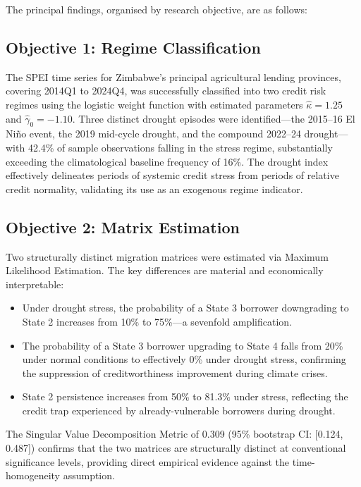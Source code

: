 \documentclass[12pt,a4paper]{article}
\begin{document}
The principal findings, organised by research objective, are as follows:

\subsection{Objective 1: Regime Classification}

The SPEI time series for Zimbabwe's principal agricultural lending provinces, covering 2014Q1 to 2024Q4, was successfully classified into two credit risk regimes using the logistic weight function with estimated parameters $\hat{\kappa} = 1.25$ and $\hat{\gamma}_0 = -1.10$. Three distinct drought episodes were identified---the 2015--16 El Niño event, the 2019 mid-cycle drought, and the compound 2022--24 drought---with 42.4\% of sample observations falling in the stress regime, substantially exceeding the climatological baseline frequency of 16\%. The drought index effectively delineates periods of systemic credit stress from periods of relative credit normality, validating its use as an exogenous regime indicator.

\subsection{Objective 2: Matrix Estimation}

Two structurally distinct migration matrices were estimated via Maximum Likelihood Estimation. The key differences are material and economically interpretable:

\begin{itemize}[noitemsep]
    \item Under drought stress, the probability of a State 3 borrower downgrading to State 2 increases from 10\% to 75\%---a sevenfold amplification.
    \item The probability of a State 3 borrower upgrading to State 4 falls from 20\% under normal conditions to effectively 0\% under drought stress, confirming the suppression of creditworthiness improvement during climate crises.
    \item State 2 persistence increases from 50\% to 81.3\% under stress, reflecting the credit trap experienced by already-vulnerable borrowers during drought.
\end{itemize}

The Singular Value Decomposition Metric of 0.309 (95\% bootstrap CI: [0.124, 0.487]) confirms that the two matrices are structurally distinct at conventional significance levels, providing direct empirical evidence against the time-homogeneity assumption.
\end{document}
